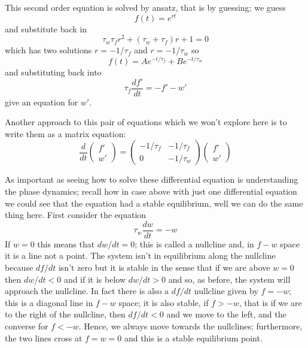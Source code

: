 \documentclass{article}
\begin{document}
This second order equation is solved by ansatz, that is by guessing; we guess
\begin{equation}
f(t)=e^{rt}
\end{equation}
and substitute back in
\begin{equation}
\tau_w\tau_f r^2+(\tau_w+\tau_f)r+1=0
\end{equation}
which has two solutions $r=-1/\tau_f$ and $r=-1/\tau_w$ so
\begin{equation}
f(t)=Ae^{-t/\tau_f}+Be^{-t/\tau_w}
\end{equation}
and substituting back into 
\begin{equation}
\tau_f \frac{df'}{dt}=-f'-w'
\end{equation}
give an equation for $w'$.

Another approach to this pair of equations which we won't explore here
is to write them as a matrix equation:
\begin{equation}
\frac{d}{dt}\left(\begin{array}{c}f'\\w'\end{array}\right)
=\left(\begin{array}{cc}-1/\tau_f&-1/\tau_f\\0&-1/\tau_w\end{array}\right)
\left(\begin{array}{c}f'\\w'\end{array}\right)
\end{equation}

As important as seeing how to solve these differential equation is
understanding the phase dynamics; recall how in case above with just
one differential equation we could see that the equation had a stable
equilibrium, well we can do the same thing here. First consider the equation
\begin{equation}
\tau_w \frac{dw}{dt}=-w
\end{equation}
If $w=0$ this means that $dw/dt=0$; this is called a nullcline and, in
$f-w$ space it is a line not a point. The system isn't in equilibrium
along the nullcline because $df/dt$ isn't zero but it is stable in the
sense that if we are above $w=0$ then $dw/dt<0$ and if it is below
$dw/dt>0$ and so, as before, the system will approach the
nullcline. In fact there is also a $df/dt$ nullcline given by $f=-w$;
this is a diagonal line in $f-w$ space; it is also stable, if $f>-w$,
that is if we are to the right of the nullcline, then $df/dt<0$ and we
move to the left, and the converse for $f<-w$. Hence, we always move
towards the nullclines; furthermore, the two lines cross at $f=w=0$
and this is a stable equilibrium point. 
\end{document}
